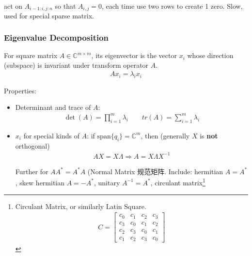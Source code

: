     act on $ A_{i-1:i,j:n} $ so that $ A_{i,j}=0 $, each time use two rows to create 1 zero. Slow, used for special sparse matrix.
    
\subsubsection{Eigenvalue Decomposition}
    For square matrix $ A \in\mathbb{C}^{m\times m}$, its eigenvector is the vector $ x_i $ whose direction (subspace) is invariant under transform operator $ A $.
    \begin{align}
        Ax_i =\lambda _ix_i
    \end{align}
    
    Properties:
\begin{itemize}[topsep=2pt,itemsep=0pt]
    \item Determinant and trace of $ A $:
    \begin{align}
        \det(A)=\prod_{i=1}^m\lambda _i\qquad tr(A)=\sum_{i=1}^m\lambda _i 
    \end{align}
    \item $ x_i $ for special kinds of $ A $: if $ \mathrm{span}\{q_i\}=\mathbb{C}^m  $, then (generally $ X $ is \textbf{not} orthogonal)
    \begin{align}
        AX=X\Lambda \Rightarrow  A=X\Lambda X^{-1} 
    \end{align}
    
    
    Further for $ AA^*=A^*A $ (Normal Matrix 规范矩阵. Include: hermitian $ A=A^* $, skew hermitian $A=-A^* $, unitary $ A^{-1}=A^* $, circulant matrix\footnote{Circulant Matrix, or similarly Latin Square.
    \begin{align}
        C=\begin{bmatrix}
            c_0&c_1&c_2&c_3\\
            c_3&c_0&c_1&c_2\\
            c_2&c_3&c_0&c_1\\
            c_1&c_2&c_3&c_0
        \end{bmatrix} 
    \end{align}
    
}
\end{itemize}
